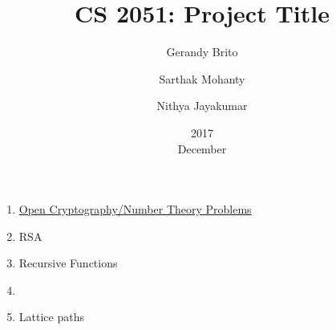 \documentclass[11pt,fleqn]{article}
\title{CS 2051: Project Title}
\date{2017\\ December}
\author{Gerandy Brito
\and Sarthak Mohanty
\and Nithya Jayakumar}
\theoremstyle{definition}
\begin{document}
\maketitle


\begin{enumerate}
    \item\href{https://unsolvedproblems.org/index.htm}{Open Cryptography/Number Theory Problems}
    \item RSA
    \item Recursive Functions
    \item 
    \item Lattice paths
\end{enumerate}
\end{document}
